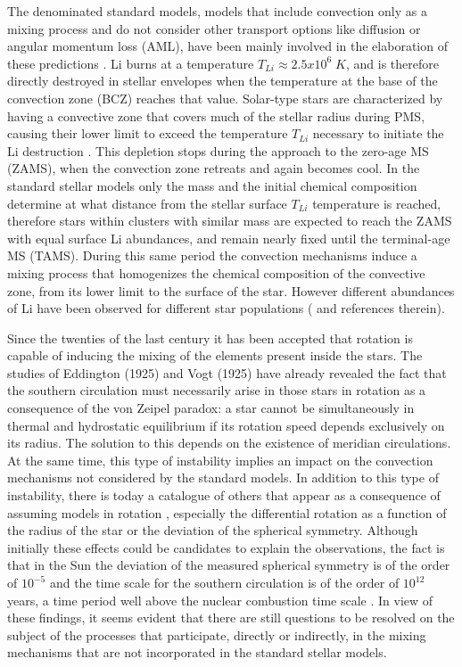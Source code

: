 \documentclass[fleqn,usenatbib]{mnras}
\begin{document}
The denominated standard models, models that include convection only as a mixing process and do not consider other transport options like diffusion or angular momentum loss (AML), have been mainly involved in the elaboration of these predictions \citep{Sestito2005}. Li burns at a temperature $T_{Li} \approx 2.5 x 10^6\; K$, and is therefore directly destroyed in stellar envelopes when the temperature at the base of the convection zone (BCZ) reaches that value. Solar-type stars are characterized by having a convective zone that covers much of the stellar radius during PMS, causing their lower limit to exceed the temperature $T_{Li}$ necessary to initiate the Li destruction \citep{Iben1965}. This depletion stops during the approach to the zero-age MS (ZAMS), when the convection zone retreats and again becomes cool. In the standard stellar models only the mass and the initial chemical composition determine at what distance from the stellar surface $T_{Li}$ temperature is reached, therefore stars within clusters with similar mass are expected to reach the ZAMS with equal surface Li abundances, and remain nearly fixed until the terminal-age MS (TAMS). During this same period the convection mechanisms induce a mixing process that homogenizes the chemical composition of the convective zone, from its lower limit to the surface of the star. However different abundances of Li have been observed for different star populations (\citet{Somers2014} and references therein).\par

Since the twenties of the last century it has been accepted that rotation is capable of inducing the mixing of the elements present inside the stars. The studies of Eddington (1925) and Vogt (1925) have already revealed the fact that the southern circulation must necessarily arise in those stars in rotation as a consequence of the von Zeipel paradox: a star cannot be simultaneously in thermal and hydrostatic equilibrium if its rotation speed depends exclusively on its radius. The solution to this depends on the existence of meridian circulations. At the same time, this type of instability implies an impact on the convection mechanisms not considered by the standard models. In addition to this type of instability, there is today a catalogue of others that appear as a consequence of assuming models in rotation \citep{Maeder2003a}, especially the differential rotation as a function of the radius of the star or the deviation of the spherical symmetry. Although initially these effects could be candidates to explain the observations, the fact is that in the Sun the deviation of the measured spherical symmetry is of the order of $10^{-5}$ and the time scale for the southern circulation is of the order of $10^{12}$ years, a time period well above the nuclear combustion time scale \citep{Pinsonneault1997}. In view of these findings, it seems evident that there are still questions to be resolved on the subject of the processes that participate, directly or indirectly, in the mixing mechanisms that are not incorporated in the standard stellar models.\par
\end{document}

